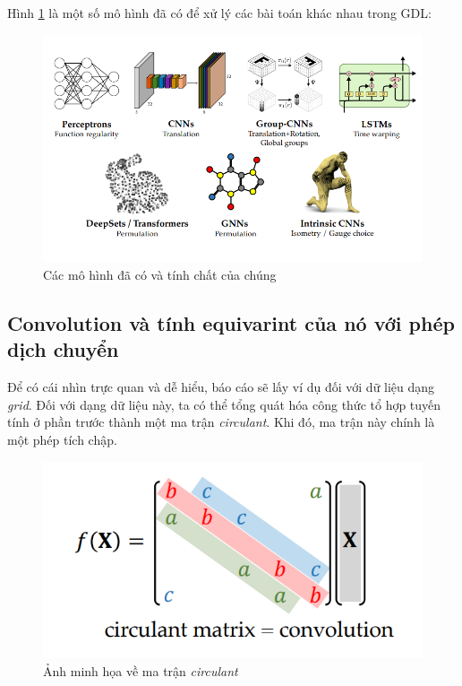 \vspace{-0.5cm}

Hình \ref{fig:model_gdl} là một số mô hình đã có để xử lý các bài toán khác nhau trong GDL:
\begin{figure}[H]
    \centering
    \includegraphics[width=1\linewidth]{Images/GDL/gdl_model_data.png}
    \caption{Các mô hình đã có và tính chất của chúng\cite{geometricdeep2022}}
    \label{fig:model_gdl}
\end{figure}




\subsection{Convolution và tính equivarint của nó với phép dịch chuyển}

Để có cái nhìn trực quan và dễ hiểu, báo cáo sẽ lấy ví dụ đối với dữ liệu dạng \textit{grid}. Đối với dạng dữ liệu này, ta có thể tổng quát hóa công thức tổ hợp tuyến tính ở phần trước thành một ma trận \textit{circulant}\cite{geometricdeep2022}. Khi đó, ma trận này chính là một phép tích chập.

\begin{figure}[H]
    \centering
    \includegraphics[width=1\linewidth]{Images/GDL/grid_conv/grid_conv.png}
    \caption{Ảnh minh họa về ma trận \textit{circulant}\cite{geometricdeep2022}}
    \label{fig:cir-matrix}
\end{figure}

